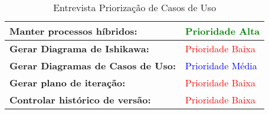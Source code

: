 \begin{table}[H]
\begin{tabular}{|p{7cm}|p{3cm}|}
\textbf{Manter processos híbridos:} &
\textcolor{green}{Prioridade Alta}
\\ \hline
\textbf{Gerar Diagrama de Ishikawa:} &
\textcolor{red}{Prioridade Baixa}
\\ \hline
\textbf{Gerar Diagramas de Casos de Uso:} &
\textcolor{blue}{Prioridade Média}
\\ \hline
\textbf{Gerar plano de iteração:} &
\textcolor{red}{Prioridade Baixa}
\\ \hline
\textbf{Controlar histórico de versão:} &
\textcolor{red}{Prioridade Baixa}
\\ \hline
\end{tabular}
\caption{Entrevista Priorização de Casos de Uso}
\label{tab:entrevista_priorizacao_uc}
\end{table}
